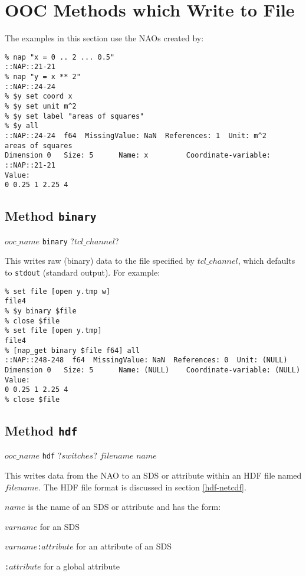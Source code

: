 
\section{OOC Methods which Write to File}

The examples in this section use the NAOs created by:
  \begin{verbatim}
% nap "x = 0 .. 2 ... 0.5"
::NAP::21-21
% nap "y = x ** 2"
::NAP::24-24
% $y set coord x
% $y set unit m^2
% $y set label "areas of squares"
% $y all
::NAP::24-24  f64  MissingValue: NaN  References: 1  Unit: m^2
areas of squares
Dimension 0   Size: 5      Name: x         Coordinate-variable: ::NAP::21-21
Value:
0 0.25 1 2.25 4
\end{verbatim}

\subsection{Method \texttt{binary}}
    \label{ooc-write-binary}

  $ooc\_name$ \texttt{binary} ?$tcl\_channel$?

This writes raw (binary) data to the file specified by 
  $tcl\_channel$, which defaults to 
  \texttt{stdout} (standard output). For example:
  \begin{verbatim}
% set file [open y.tmp w]
file4
% $y binary $file
% close $file
% set file [open y.tmp]
file4
% [nap_get binary $file f64] all
::NAP::248-248  f64  MissingValue: NaN  References: 0  Unit: (NULL)
Dimension 0   Size: 5      Name: (NULL)    Coordinate-variable: (NULL)
Value:
0 0.25 1 2.25 4
% close $file
\end{verbatim}

\subsection{Method \texttt{hdf}}
    \label{ooc-write-hdf}

  $ooc\_name$ \texttt{hdf} ?$switches$?  $filename$ $name$

This writes data from the NAO to an SDS or attribute within an HDF
  file named 
  $filename$.
The HDF file format is discussed in section \ref{hdf-netcdf}.

  $name$ is the name of an SDS or attribute and has the
  form:
\begin{bullets}
    \item $varname$ for an SDS
    \item $varname$\texttt{:}$attribute$ for an attribute of an SDS
    \item \texttt{:}$attribute$ for a global attribute
\end{bullets}
  
